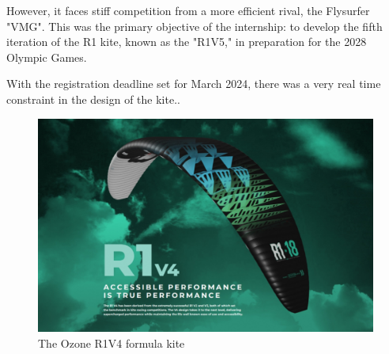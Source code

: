 However, it faces stiff competition from a more efficient rival, the Flysurfer "VMG". This was the primary objective of the internship: to develop the fifth iteration of the R1 kite, known as the "R1V5," in preparation for the 2028 Olympic Games. 

With the registration deadline set for March 2024, there was a very real time constraint in the design of the kite..

\begin{figure}[H]
    \centering
    \includegraphics[width=1.\textwidth]{figures/introduction/R1V4.jpg}
    \caption{The Ozone R1V4 formula kite}
    \label{fig:R1V4}
\end{figure}